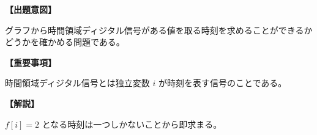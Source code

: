 \noindent \textbf{【出題意図】}

\noindent グラフから時間領域ディジタル信号がある値を取る時刻を求めることができるかどうかを確かめる問題である。

\vspace{1em}
\noindent \textbf{【重要事項】}

\bigskip
\noindent 時間領域ディジタル信号とは独立変数 $i$ が時刻を表す信号のことである。

\vspace{1em}
\noindent \textbf{【解説】}

\noindent $f[i]=2$ となる時刻は一つしかないことから即求まる。

